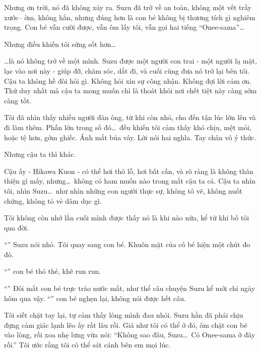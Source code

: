 \documentclass[../main.tex]{subfiles}
\begin{document}
Nhưng ơn trời, nó đã không xảy ra. Suzu đã trở về an toàn, không một vết trầy xước-- ờm, không hẳn, nhưng đúng hơn là con bé không bị thương tích gì nghiêm trọng. Con bé vẫn cười được, vẫn ôm lấy tôi, vẫn gọi hai tiếng ``Onee-sama''\dots

Nhưng điều khiến tôi sửng sốt hơn\dots

\dots là nó không trở về một mình. Suzu được một người con trai - một người lạ mặt, lạc vào nơi này - giúp đỡ, chăm sóc, dắt đi, và cuối cùng đưa nó trở lại bên tôi. Cậu ta không hề đòi hỏi gì. Không hỏi xin sự công nhận. Không đợi lời cảm ơn. Thứ duy nhất mà cậu ta mong muốn chỉ là thoát khỏi nơi chết tiệt này càng sớm càng tốt.

Tôi đã nhìn thấy nhiều người đàn ông, từ khi còn nhỏ, cho đến tận lúc lớn lên và đi làm thêm. Phần lớn trong số đó\dots\ đều khiến tôi cảm thấy khó chịu, mệt mỏi, hoặc tệ hơn, gớm ghiếc. Ánh mắt bủa vây. Lời nói hai nghĩa. Tay chân vô ý thức.

Nhưng cậu ta thì khác.

Cậu ấy - Hikawa Kuon - có thể hơi thô lỗ, hơi bất cần, và rõ ràng là không thân thiện gì mấy, nhưng\dots\ không có ham muốn nào trong mắt cậu ta cả. Cậu ta nhìn tôi, nhìn Suzu\dots\ như nhìn những con người thực sự, không tô vẽ, không nuốt chửng, không tỏ vẻ dâm dục gì.

Tôi không còn nhớ lần cuối mình được thấy nó là khi nào nữa, kể từ khi bố tôi qua đời.

``'' Suzu nói nhỏ. Tôi quay sang con bé. Khuôn mặt của cô bé hiện một chút đo đỏ.

``'' con bé thó thé, khẽ run run.

``'' Đôi mắt con bé trực trào nước mắt, như thể câu chuyện Suzu kể mới chỉ ngày hôm qua vậy. ``'' con bé nghẹn lại, không nói được hết câu.

Tôi siết chặt tay lại, tự cảm thấy lòng mình đau nhói. Suzu hẳn đã phải chịu đựng cảm giác lạnh lẽo ấy rất lâu rồi. Giá như tôi có thể ở đó, ôm chặt con bé vào lòng, rồi xoa nhẹ lưng vừa nói: ``Không sao đâu, Suzu\dots\ Có Onee-sama ở đây rồi.'' Tôi ước rằng tôi có thể sát cánh bên em mọi lúc.
\end{document}
